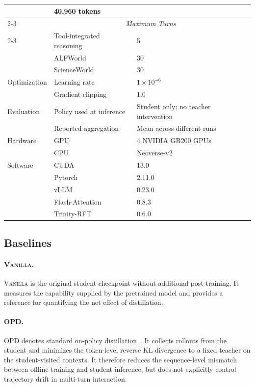 \begin{table}[t]
{\begin{tabular}{@{}lll@{}}
        & 40,960 tokens \\
        \cmidrule(lr){2-3}
        & \multicolumn{2}{c}{\textit{Maximum Turns}} \\
        \cmidrule(lr){2-3}
        & Tool-integrated reasoning
        & 5 \\
        & ALFWorld
        & 30 \\
        & ScienceWorld
        & 30 \\
        \midrule
        Optimization
        & Learning rate
        & $1\times10^{-6}$ \\
        & Gradient clipping
        & 1.0 \\
        \midrule
        Evaluation
        & Policy used at inference
        & Student only; no teacher intervention \\
        & Reported aggregation
        & Mean across different runs \\
        \midrule
        Hardware
        & GPU 
        & 4 NVIDIA GB200 GPUs \\
        & CPU
        & Neoverse-v2 \\
        \midrule
        Software
        & CUDA
        & 13.0 \\
        & Pytorch~\citep{PaszkeGMLBCKLGA19}
        & 2.11.0 \\
        & vLLM~\citep{KwonLZ0ZY0ZS23} 
        & 0.23.0 \\
        & Flash-Attention~\citep{DaoFERR22} 
        & 0.8.3 \\
        & Trinity-RFT~\citep{abs-2505-17826} 
        & 0.6.0 \\
        \bottomrule
    \end{tabular}
    }
\end{table} 

\subsection{Baselines}
\label{app:baselines}

\paragraph{\textsc{Vanilla}.}
\textsc{Vanilla} is the original student checkpoint without additional post-training. 
It measures the capability supplied by the pretrained model and provides a reference for quantifying the net effect of distillation.

\paragraph{\textsc{OPD}.}
\textsc{OPD} denotes standard on-policy distillation~\citep{AgarwalVZSGGB24,Gu0WH24}. 
It collects rollouts from the student and minimizes the token-level reverse KL divergence to a fixed teacher on the student-visited contexts. 
It therefore reduces the sequence-level mismatch between offline training and student inference, but does not explicitly control trajectory drift in multi-turn interaction.

